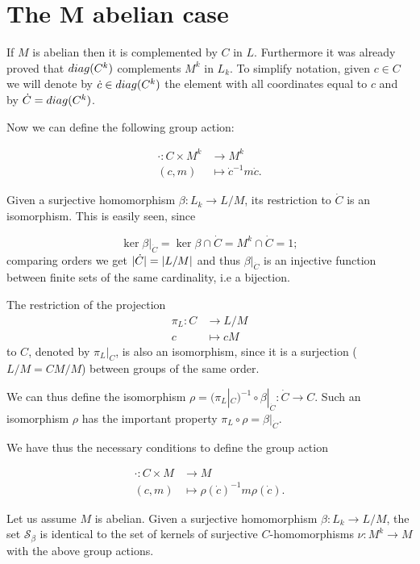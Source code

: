 \section{The M abelian case}

\newcommand{\dc}[0]{\dot{c}}

If $M$ is abelian then it is complemented by $C$ in $L$. Furthermore it was already proved that $diag({C^k})$ complements $M^k$ in $L_k$. To simplify notation, given $c \in C$ we will denote by $\dc \in \diag{C^k}$ the element with all coordinates equal to $c$ and by $\dot{C} = diag({C^k})$.

Now we can define the following group action:

\begin{align*}
    \cdot \colon C \times M^k &\rightarrow M^k \\
                (c, m)  &\mapsto \dc^{-1}m\dc.
\end{align*}

Given a surjective homomorphism $\beta \colon L_k \rightarrow L/M$, its restriction to $\dot{C}$ is an isomorphism. This is easily seen, since

$$
\ker{\beta|_{\dot C}} = \ker \beta \cap \dot{C} = M^k \cap \dot{C} = 1;
$$ comparing orders we get $| \dot{C} | = | L/M |$ and thus $\beta|_{\dot C}$ is an injective function between finite sets of the same cardinality, i.e a bijection. 

The restriction of the projection
\begin{align*}
    \pi_L \colon C &\rightarrow L/M \\
                 c &\mapsto cM
\end{align*}
to $C$, denoted by $\pi_L|_C$, is also an isomorphism, since it is a surjection ($L/M = CM/M$) between groups of the same order.

We can thus define the isomorphism $\rho = (\pi_L|_C)^{-1} \circ \beta|_{\dot C} \colon \dot{C} \rightarrow C$. Such an isomorphism $\rho$ has the important property $\pi_L \circ \rho = \beta|_{\dot C}$.

We have thus the necessary conditions to define the group action

\begin{align*}
    \cdot \colon C \times M &\rightarrow M \\
                (c, m)  &\mapsto \rho(\dc)^{-1}m\rho(\dc).
\end{align*}


\begin{theorem}
    \label{S4:LMhom}
    Let us assume $M$ is abelian. Given a surjective homomorphism $\beta \colon L_k \rightarrow L/M$, the set $\mathscr{S}_\beta$ is identical to the set of kernels of surjective $C$-homomorphisms $\nu \colon M^k \rightarrow M$ with the above group actions.
\end{theorem}

